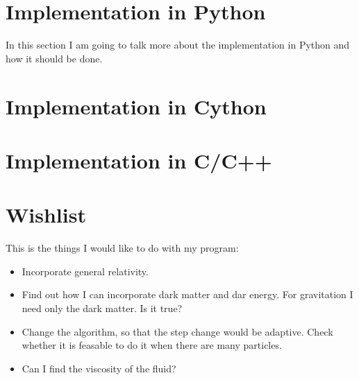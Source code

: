 \documentclass[
    draft,
    fontsize=11pt,
    DIV=calc
]{scrartcl}
\begin{document}
\section{Implementation in Python}

In this section I am going to talk more about the implementation in Python and how it should be done.
%

\section{Implementation in Cython}

\section{Implementation in C/C++}

\section{Wishlist}

This is the things I would like to do with my program:
\begin{itemize}
    \item Incorporate general relativity.
    \item Find out how I can incorporate dark matter and dar energy. For gravitation I need only the dark matter. Is it true?
    \item Change the algorithm, so that the step change would be adaptive. Check whether it is feasable to do it when there are many particles.
    \item Can I find the viscosity of the fluid?
\end{itemize}
\end{document}
